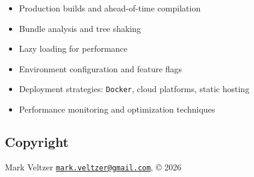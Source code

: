\documentclass[
]{article}
\providecommand{\tightlist}{%
  \setlength{\itemsep}{0pt}\setlength{\parskip}{0pt}}
\begin{document}
\begin{itemize}
  \begin{itemize}
  \tightlist
  \item
    Production builds and ahead-of-time compilation
  \item
    Bundle analysis and tree shaking
  \item
    Lazy loading for performance
  \item
    Environment configuration and feature flags
  \item
    Deployment strategies: \texttt{Docker}, cloud platforms, static
    hosting
  \item
    Performance monitoring and optimization techniques
  \end{itemize}
\end{itemize}

\subsection{Copyright}\label{copyright}

Mark Veltzer
\href{mailto:mark.veltzer@gmail.com}{\nolinkurl{mark.veltzer@gmail.com}},
© 2026
\end{document}
